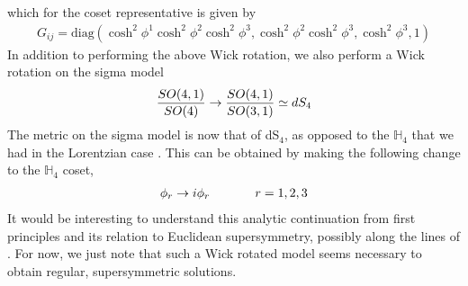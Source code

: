 \documentclass[12pt]{article}
\begin{document}
which for the coset representative is given by
\begin{eqnarray}
G_{ij}=\mathrm{diag}\left(\cosh^2 \phi^1 \cosh^2 \phi^2 \cosh^2 \phi^3, \cosh^2 \phi^2 \cosh^2 \phi^3, \cosh ^2 \phi^3, 1\right)
\end{eqnarray}
In addition to performing the above Wick rotation, we also perform a Wick rotation on the sigma model  
\begin{eqnarray}
{SO(4,1) \over SO(4)} \to{SO(4,1) \over SO(3,1)} \simeq dS_4
\end{eqnarray}
The metric on the sigma model is now that of dS$_4$, as opposed to the $\mathbb{H}_4$ that we had in the Lorentzian case . This can be obtained by making the following change to the $\mathbb{H}_4$ coset,
\begin{eqnarray}
 \phi_r\rightarrow i \phi_r \hspace{0.5 in}r=1,2,3
 \end{eqnarray}
It would be interesting to understand this analytic continuation from first principles and its relation to Euclidean supersymmetry, possibly along the lines of . For now, we just note that such a Wick rotated model seems necessary to obtain regular, supersymmetric solutions. 
\end{document}
